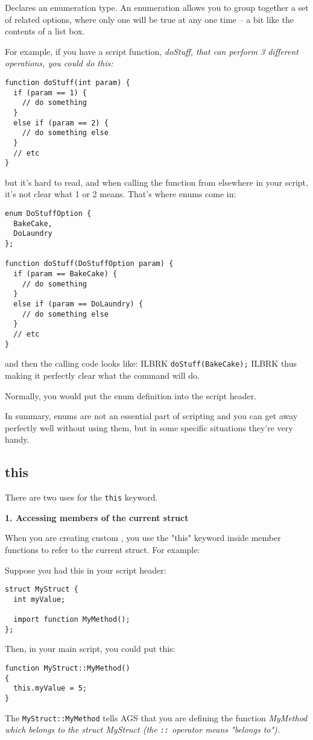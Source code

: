 Declares an enumeration type. An enumeration allows you to group together a set of related
options, where only one will be true at any one time -- a bit like the contents of a list box.

For example, if you have a script function, \it{doStuff}, that can perform 3 different
operations, you could do this:

\begin{verbatim}
function doStuff(int param) {
  if (param == 1) {
    // do something
  }
  else if (param == 2) {
    // do something else
  }
  // etc
}
\end{verbatim}

but it's hard to read, and when calling the function from elsewhere in your script,
it's not clear what 1 or 2 means. That's where enums come in:

\begin{verbatim}
enum DoStuffOption {
  BakeCake,
  DoLaundry
};

function doStuff(DoStuffOption param) {
  if (param == BakeCake) {
    // do something
  }
  else if (param == DoLaundry) {
    // do something else
  }
  // etc
}
\end{verbatim}

and then the calling code looks like: ILBRK
\verb$doStuff(BakeCake);$ ILBRK
thus making it perfectly clear what the command will do.

Normally, you would put the enum definition into the script header.

In summary, enums are not an essential part of scripting and you can get away perfectly
well without using them, but in some specific situations they're very handy.


\subsection{this}\label{this}%

There are two uses for the \verb$this$ keyword.

\bf{1. Accessing members of the current struct}

When you are creating custom , you use the "this" keyword inside member
functions to refer to the current struct. For example:

Suppose you had this in your script header:
\begin{verbatim}
struct MyStruct {
  int myValue;

  import function MyMethod();
};
\end{verbatim}
Then, in your main script, you could put this:
\begin{verbatim}
function MyStruct::MyMethod()
{
  this.myValue = 5;
}
\end{verbatim}
The \verb$MyStruct::MyMethod$ tells AGS that you are defining the function \it{MyMethod}
which belongs to the struct \it{MyStruct} (the \verb$::$ operator means "belongs to").

